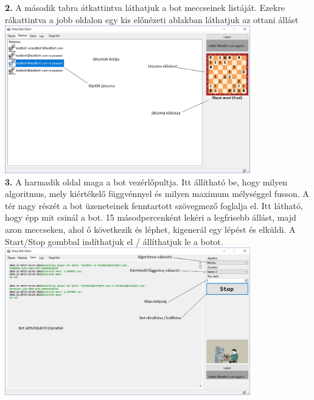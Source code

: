 \documentclass[twoside, a4paper, 12pt]{article}
\begin{document}
\noindent \textbf{2.} A második tabra átkattintva láthatjuk a bot meccseinek listáját. Ezekre rákattintva a jobb oldalon egy kis előnézeti ablakban láthatjuk az ottani állást \\
\includegraphics[width=0.8\textwidth]{img/botClient_2.png} \\

\noindent \textbf{3.} A harmadik oldal maga a bot vezérlőpultja. Itt állítható be, hogy milyen algoritmus, mely kiértékelő függvénnyel és milyen maximum mélységgel fusson. A tér nagy részét a bot üzeneteinek fenntartott szövegmező foglalja el. Itt látható, hogy épp mit csinál a bot. 15 másodpercenként lekéri a legfrisebb állást, majd azon meccseken, ahol ő következik és léphet, kigenerál egy lépést és elküldi. A Start/Stop gombbal indíthatjuk el / állíthatjuk le a botot. \\
\includegraphics[width=0.8\textwidth]{img/botClient_3.png} \\
\end{document}
